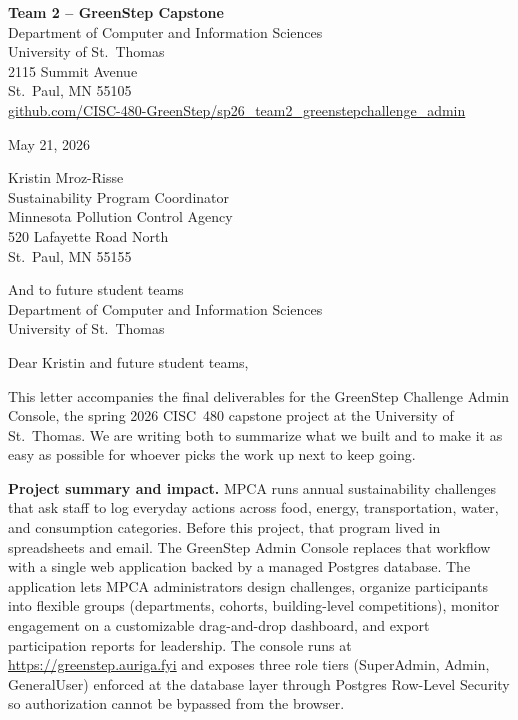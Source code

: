 \documentclass[11pt,letterpaper]{article}
\begin{document}
\begin{flushleft}
\textbf{Team 2 -- GreenStep Capstone} \\
Department of Computer and Information Sciences \\
University of St.\ Thomas \\
2115 Summit Avenue \\
St.\ Paul, MN 55105 \\
\href{https://github.com/CISC-480-GreenStep/sp26_team2_greenstepchallenge_admin}{github.com/CISC-480-GreenStep/sp26\_team2\_greenstepchallenge\_admin}
\end{flushleft}

\vspace{1em}
May 21, 2026

\vspace{1em}

\begin{flushleft}
Kristin Mroz-Risse \\
Sustainability Program Coordinator \\
Minnesota Pollution Control Agency \\
520 Lafayette Road North \\
St.\ Paul, MN 55155

\vspace{0.5em}
And to future student teams \\
Department of Computer and Information Sciences \\
University of St.\ Thomas
\end{flushleft}

\vspace{1.5em}

Dear Kristin and future student teams,

This letter accompanies the final deliverables for the GreenStep Challenge Admin
Console, the spring 2026 CISC~480 capstone project at the University of St.\ Thomas.
We are writing both to summarize what we built and to make it as easy as possible
for whoever picks the work up next to keep going.

\textbf{Project summary and impact.} MPCA runs annual sustainability challenges
that ask staff to log everyday actions across food, energy, transportation,
water, and consumption categories. Before this project, that program lived in
spreadsheets and email. The GreenStep Admin Console replaces that workflow with
a single web application backed by a managed Postgres database. The application
lets MPCA administrators design challenges, organize participants into flexible
groups (departments, cohorts, building-level competitions), monitor engagement
on a customizable drag-and-drop dashboard, and export participation reports for
leadership. The console runs at \url{https://greenstep.auriga.fyi} and exposes
three role tiers (SuperAdmin, Admin, GeneralUser) enforced at the database
layer through Postgres Row-Level Security so authorization cannot be bypassed
from the browser.
\end{document}
